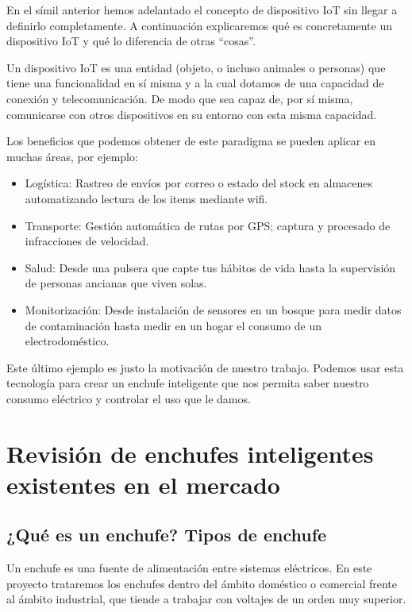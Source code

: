 \documentclass[a4paper,10pt]{article}
\begin{document}
En el símil anterior hemos adelantado el concepto de dispositivo IoT sin
llegar a definirlo completamente. A continuación explicaremos qué es
concretamente un dispositivo IoT y qué lo diferencia de otras ``cosas''.

Un dispositivo IoT es una entidad (objeto, o incluso animales o
personas) que tiene una funcionalidad en sí misma y a la cual dotamos de
una capacidad de conexión y telecomunicación. De modo que sea capaz de,
por sí misma, comunicarse con otros dispositivos en su entorno con esta
misma capacidad.

Los beneficios que podemos obtener de este paradigma se pueden aplicar
en muchas áreas, por
ejemplo\cite{vongsingthongs.;smanchats.IoTExamplesSuranaree}:

\begin{itemize}
\item
  Logística: Rastreo de envíos por correo o estado del stock en
  almacenes automatizando lectura de los items mediante wifi.
\item
  Transporte: Gestión automática de rutas por GPS; captura y procesado
  de infracciones de velocidad.
\item
  Salud: Desde una pulsera que capte tus hábitos de vida hasta
  la supervisión de personas ancianas que viven solas.
\item
  Monitorización: Desde instalación de sensores en un bosque para medir
  datos de contaminación hasta medir en un hogar el consumo de un
  electrodoméstico.
\end{itemize}

Este último ejemplo es justo la motivación de nuestro trabajo. Podemos
usar esta tecnología para crear un enchufe inteligente que nos permita
saber nuestro consumo eléctrico y controlar el uso que le damos.

\newpage

\section{Revisión de enchufes inteligentes existentes en el
mercado}\label{revisiuxf3n-de-enchufes-inteligentes-existentes-en-el-mercado}

\subsection{¿Qué es un enchufe? Tipos de
enchufe}\label{quuxe9-es-un-enchufe-tipos-de-enchufe}

Un enchufe es una fuente de alimentación entre sistemas eléctricos. En
este proyecto trataremos los enchufes dentro del ámbito doméstico o
comercial frente al ámbito industrial, que tiende a trabajar con
voltajes de un orden muy superior.
\end{document}
